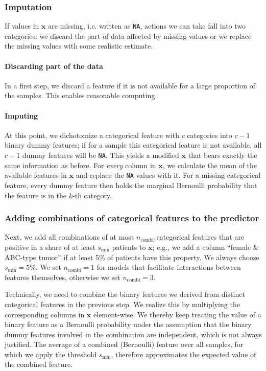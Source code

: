\subsubsection{Imputation}

If values in $\mathbf{x}$ are missing, i.e. written as \texttt{NA}, actions we can take fall into two 
categories: we discard the part of data affected by missing values or we replace the missing values 
with some realistic estimate.

\paragraph{Discarding part of the data}

In a first step, we discard a feature if it is not available for a large proportion of the samples.
This enables reasonable computing.

\paragraph{Imputing}

At this point, we dichotomize a categorical 
feature with $c$ categories into $c-1$ binary dummy features; if for a sample this categorical feature is not 
available, all $c-1$ dummy features will be \texttt{NA}. This yields a modified $\mathbf{x}$ that 
bears exactly the same information as before. For \textit{every} column in $\mathbf{x}$, we calculate the 
mean of the available features in $\mathbf{x}$ and replace the \texttt{NA} values with it. 
For a missing categorical feature, every dummy feature then holds the marginal Bernoulli 
probability that the feature is in the $k$-th category. 

\subsubsection{Adding combinations of categorical features to the predictor}

Next, we add all combinations of at most $n_\text{combi}$ categorical features that are positive in a 
share of at least $s_\text{min}$ patients to $\mathbf{x}$; e.g., we add a column ``female \& ABC-type 
tumor'' if at least \num{5}\% of patients have this property. We always choose $s_\text{min}
= 5\%$. We set $n_\text{combi} = 1$ for models that facilitate interactions between features 
themselves, otherwise we set $n_\text{combi} = 3$.

Technically, we need to combine the binary features we derived from distinct categorical features 
in the previous step. We realize this by multiplying the corresponding columns in 
$\mathbf{x}$ element-wise. We thereby keep treating the value of a binary feature as a Bernoulli
probability under the assumption that the binary dummy features involved in the combination are 
independent, which is not always justified. The average of a combined (Bernoulli) feature over all 
samples, for which we apply the threshold $s_\text{min}$, therefore approximates the expected value 
of the combined feature.


